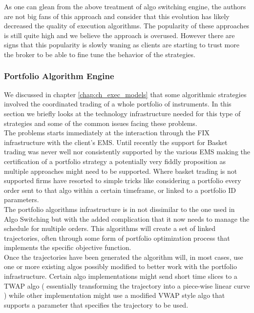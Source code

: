 As one can glean from the above treatment of algo switching engine, the authors are not big fans of this approach and consider that this evolution has likely decreased the quality of execution algorithms. The popularity of these approaches is still quite high and we believe the approach is overused. However there are signs that this popularity is slowly waning as clients are starting to trust more the broker to be able to fine tune the behavior of the strategies.

\subsubsection{Portfolio Algorithm Engine}
We discussed in chapter \ref{chap:ch_exec_models} that some algorithmic strategies involved the coordinated trading of a whole portfolio of instruments. In this section we briefly looks at the technology infrastructure needed for this type of strategies and some of the common issues facing these problems.\\

The problems starts immediately at the interaction through the FIX infrastructure with the client's EMS. Until recently the support for Basket trading was  never well nor consistently supported by the various EMS making the certification of a portfolio strategy a potentially very fiddly proposition as multiple approaches might need to be supported. Where basket trading is not supported firms have resorted to simple tricks like considering a portfolio every order sent to that algo within a certain timeframe, or linked to a portfolio ID parameters.  \\

The portfolio algorithms infrastructure is in not dissimilar to the one used in Algo Switching but with the added complication that it now needs to manage the schedule for multiple orders. This algorithms will create a set of linked trajectories, often through some form of portfolio optimization process that implements the specific objective function. \\

Once the trajectories have been generated the algorithm will, in most cases, use one or more existing  algos possibly modified to better work with the portfolio infrastructure.  Certain algo implementations might send short time slices to a TWAP algo ( essentially transforming the trajectory into a piece-wise linear curve ) while other implementation might use a modified VWAP style algo that supports a parameter that specifies the trajectory to be used. \\

